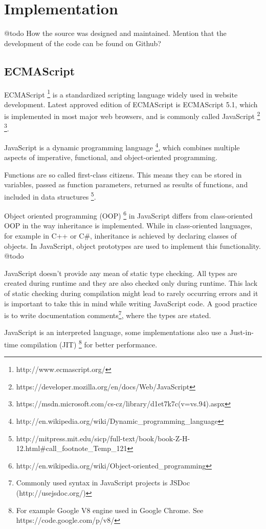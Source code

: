 \chapter{Implementation}
@todo How the source was designed and maintained. Mention that the development of the code can be found on Github?


\section{ECMAScript}
ECMAScript \footnote{http://www.ecmascript.org/} is a standardized scripting language widely used in website development. Latest approved edition of ECMAScript is ECMAScript 5.1, which is implemented in most major web browsers, and is commonly called JavaScript \footnote{https://developer.mozilla.org/en/docs/Web/JavaScript} \footnote{https://msdn.microsoft.com/cs-cz/library/d1et7k7c(v=vs.94).aspx}. 

JavaScript is a dynamic programming language \footnote{http://en.wikipedia.org/wiki/Dynamic\_programming\_language}, which combines multiple aspects of imperative, functional, and object-oriented programming.

Functions are so called first-class citizens. This means they can be stored in variables, passed as function parameters, returned as results of functions, and included in data structures \cite{}\footnote{http://mitpress.mit.edu/sicp/full-text/book/book-Z-H-12.html\#call\_footnote\_Temp\_121}.

Object oriented programming (OOP) \footnote{http://en.wikipedia.org/wiki/Object-oriented\_programming} in JavaScript differs from class-oriented OOP in the way inheritance is implemented. While in class-oriented languages, for example in C++ or C\#, inheritance is achieved by declaring classes of objects. In JavaScript, object prototypes are used to implement this functionality. @todo

JavaScript doesn't provide any mean of static type checking. All types are created during runtime and they are also checked only during runtime. This lack of static checking during compilation might lead to rarely occurring errors and it is important to take this in mind while writing JavaScript code. A good practice is to write documentation comments\footnote{Commonly used syntax in JavaScript projects is JSDoc (http://usejsdoc.org/)}, where the types are stated.

JavaScript is an interpreted language, some implementations also use a Just-in-time compilation (JIT) \footnote{For example Google V8 engine used in Google Chrome. See https://code.google.com/p/v8/} for better performance. 

